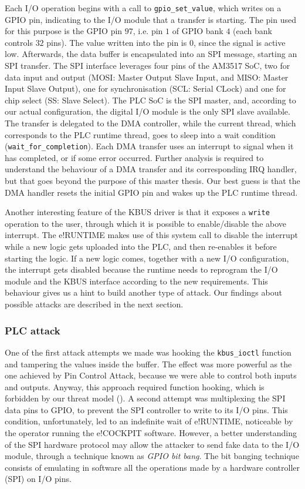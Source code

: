 Each I/O operation begins with a call to \verb|gpio_set_value|, which writes on a GPIO pin, indicating to the I/O module that a transfer is starting.
The pin used for this purpose is the GPIO pin $97$, i.e. pin $1$ of GPIO bank $4$ (each bank controls $32$ pins). The value written into the pin is $0$,
since the signal is active low. Afterwards, the data buffer is encapsulated into an SPI message, starting an SPI transfer.
The SPI interface leverages four pins of the AM3517 SoC, two for data input and output (MOSI: Master Output Slave Input, and MISO: Master Input Slave Output),
one for synchronisation (SCL: Serial CLock) and one for chip select (SS: Slave Select).
The PLC SoC is the SPI master, and, according to our actual configuration, the digital I/O module is the only SPI slave available.
The transfer is delegated to the DMA controller, while the current thread, which corresponds to the PLC runtime thread,
goes to sleep into a wait condition (\verb|wait_for_completion|). Each DMA transfer uses an interrupt to signal when it has completed, or if some error occurred.
Further analysis is required to understand the behaviour of a DMA transfer and its corresponding IRQ handler, but that goes beyond the purpose of this master thesis.
Our best guess is that the DMA handler resets the initial GPIO pin and wakes up the PLC runtime thread.

Another interesting feature of the KBUS driver is that it exposes a \verb|write| operation to the user, through which it is possible to enable/disable the above interrupt.
The e!RUNTIME makes use of this system call to disable the interrupt while a new logic gets uploaded into the PLC, and then re-enables it before starting the logic.
If a new logic comes, together with a new I/O configuration, the interrupt gets disabled because the runtime needs to reprogram the I/O module
and the KBUS interface according to the new requirements. This behaviour gives us a hint to build another type of attack.
Our findings about possible attacks are described in the next section.


\subsubsection{PLC attack}

One of the first attack attempts we made was hooking the \verb|kbus_ioctl| function and tampering the values
inside the buffer. The effect was more powerful as the one achieved by Pin Control Attack, because we were able to control both inputs and outputs.
Anyway, this approach required function hooking, which is forbidden by our threat model ().
A second attempt was multiplexing the SPI data pins to GPIO, to prevent the SPI controller to write to its I/O pins.
This condition, unfortunately, led to an indefinite wait of e!RUNTIME, noticeable by the operator running the e!COCKPIT software.
However, a better understanding of the SPI hardware protocol may allow the attacker to send fake data to the I/O module,
through a technique known as \emph{GPIO bit bang}. The bit banging technique consists of emulating in software all the operations made by
a hardware controller (\eg SPI) on I/O pins.

